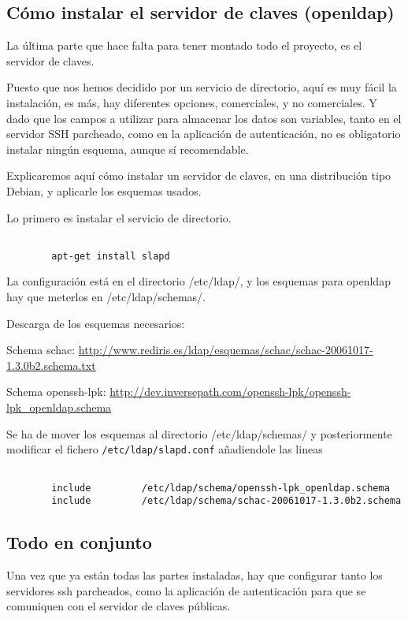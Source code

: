         \subsection{Cómo instalar el servidor de claves (openldap)}

        La última parte que hace falta para tener montado todo el
        proyecto, es el servidor de claves.

        Puesto que nos hemos decidido por un servicio de directorio,
        aquí es muy fácil la instalación, es más, hay diferentes
        opciones, comerciales, y no comerciales. Y dado que los
        campos a utilizar para almacenar los datos son variables,
        tanto en el servidor SSH parcheado, como en la aplicación de
        autenticación, no es obligatorio instalar ningún esquema,
        aunque sí recomendable.

        Explicaremos aquí cómo instalar un servidor de claves, en una
        distribución tipo Debian, y aplicarle los esquemas usados.

        Lo primero es instalar el servicio de directorio.

        \begin{verbatim}

        apt-get install slapd

        \end{verbatim}

        La configuración está en el directorio /etc/ldap/, y los
        esquemas para openldap hay que meterlos en /etc/ldap/schemas/.

        Descarga de los esquemas necesarios:

        Schema schac: 
        \url{http://www.rediris.es/ldap/esquemas/schac/schac-20061017-1.3.0b2.schema.txt}

        Schema openssh-lpk:
        \url{http://dev.inversepath.com/openssh-lpk/openssh-lpk\_openldap.schema}


        Se ha de mover los esquemas al directorio /etc/ldap/schemas/ y
        posteriormente modificar el fichero
        \texttt{/etc/ldap/slapd.conf} añadiendole las lineas

        \begin{verbatim}

        include         /etc/ldap/schema/openssh-lpk_openldap.schema
        include         /etc/ldap/schema/schac-20061017-1.3.0b2.schema

        \end{verbatim}

        
        \subsection{Todo en conjunto}

        Una vez que ya están todas las partes instaladas, hay que
        configurar tanto los servidores ssh parcheados, como la
        aplicación de autenticación para que se comuniquen con el
        servidor de claves públicas.

